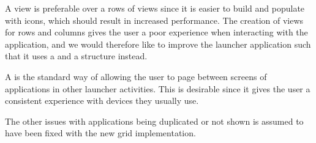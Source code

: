 A  view is preferable over a rows of  views since it is easier to build and populate with icons, which should result in increased performance.
The creation of  views for rows and columns gives the user a poor experience when interacting with the application, and we would therefore like to improve the launcher application such that it uses a  and a  structure instead. 

A  is the standard way of allowing the user to page between screens of applications in other launcher activities. This is desirable since it gives the user a consistent experience with devices they usually use. 

The other issues with applications being duplicated or not shown is assumed to have been fixed with the new grid implementation.


